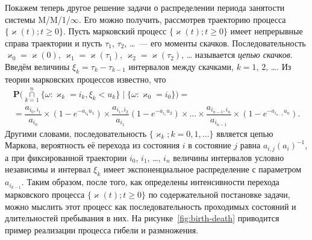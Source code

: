 \documentclass[10pt,oneside,final]{book}
\renewcommand{\Pr}{{\mathbf P}}
\begin{document}
Покажем теперь другое решение задачи о распределении периода занятости системы
M/M/1/$\infty$. Его можно получить, рассмотрев траекторию процесса
$\{\varkappa(t); t\geqslant0\}$. Пусть марковский процесс $\{\varkappa(t);
t\geqslant0\}$ имеет непрерывные справа траектории и пусть $\tau_1$, $\tau_2$,
\ldots{}~--- его моменты скачков. Последовательность $\varkappa_0=\varkappa(0)$,
$\varkappa_1=\varkappa(\tau_1)$, $\varkappa_2=\varkappa(\tau_2)$, \ldots{}
называется \emph{цепью скачков}. Введём величины $\xi_k=\tau_k-\tau_{k-1}$
интервалов между скачками, $k=1$, $2$, \ldots{}. Из теории марковских процессов
известно, что
\begin{multline*}
  \Pr\bigl( \mathop{\cap}\limits_{k=1}^n \{\omega\colon
  \varkappa_k=i_k, \xi_k<u_k
  \}\mid\{\omega\colon \varkappa_0=i_0\}\bigr)=
  \\ =
  \dfrac{a_{i_0,i_1}}{a_{i_0}}\times (1-e^{-a_{i_0} u_1})\times
  \dfrac{a_{i_1,i_2}}{a_{i_1}} (1-e^{-a_{i_1} u_2}) \times \ldots\times
  \dfrac{a_{i_{n-1},i_n}}{a_{i_{n-1}}} \times(1-e^{-a_{i_{n-1}} u_n}).
\end{multline*}
Другими словами, последовательность $\{\varkappa_k; k=0, 1, \ldots\}$ является
цепью Маркова, вероятность её перехода  из состояния $i$ в состояние $j$ равна
$a_{i,j}(a_i)^{-1}$, а при фиксированной траектории $i_0$, $i_1$, \ldots, $i_n$
величины интервалов условно независимы и интервал $\xi_k$ имеет экспоненциальное
распределение с параметром~$a_{i_{k-1}}$. Таким образом, после того, как
определены интенсивности перехода марковского процесса $\{\varkappa(t);
t\geqslant0\}$ по содержательной постановке задачи, можно мыслить этот процесс
как последовательность проходимых состояний и длительностей пребывания в них. На
рисунке~\ref{fig:birth-death} приводится пример реализации процесса гибели и
размножения. 
\end{document}
